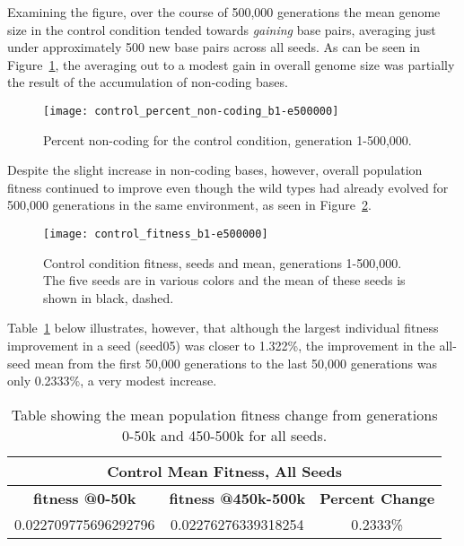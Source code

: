 Examining the figure, over the course of 500,000 generations the mean genome size in the control condition tended towards \textit{gaining} base pairs, averaging just under approximately 500 new base pairs across all seeds. As can be seen in Figure~\ref{fig:control_perc_non-coding}, the averaging out to a modest gain in overall genome size was partially the result of the accumulation of non-coding bases.

\begin{figure}[H]
	\texttt{[image: control\_percent\_non-coding\_b1-e500000]}
	\caption[Control condition percent non-coding]{Percent non-coding for the control condition, generation 1-500,000.}
	\label{fig:control_perc_non-coding}
\end{figure}
Despite the slight increase in non-coding bases, however, overall population fitness continued to improve even though the wild types had already evolved for 500,000 generations in the same environment, as seen in Figure~\ref{fig:control_fitness}.

\begin{figure}[H]
	\texttt{[image: control\_fitness\_b1-e500000]}
	\caption[Control condition fitness]{Control condition fitness, seeds and mean, generations 1-500,000. The five seeds are in various colors and the mean of these seeds is shown in black, dashed.}
	\label{fig:control_fitness}
\end{figure}

Table~\ref{table:control_mean_fitness_change} below illustrates, however, that although the largest individual fitness improvement in a seed (seed05) was closer to 1.322\%, the improvement in the all-seed mean from the first 50,000 generations to the last 50,000 generations was only 0.2333\%, a very modest increase. 

\begin{table}[H]
	\centering
	\begin{tabular}{|c|c|c|}
		\hline
		\multicolumn{3}{|c|}{\Large \textbf{Control Mean Fitness, All Seeds}} \\
		\hline
		\textbf{fitness @0-50k} & \textbf{fitness @450k-500k} & \textbf{Percent Change} \\
		\hline \hline
		0.022709775696292796 & 0.02276276339318254 & 0.2333\%  \\
		\hline
		
	\end{tabular}
	\caption[Control Population Mean Fitness, Gens 0-50k, 450k-500k]{Table showing the mean population fitness change from generations 0-50k and 450-500k for all seeds.}
	\label{table:control_mean_fitness_change}
\end{table}

